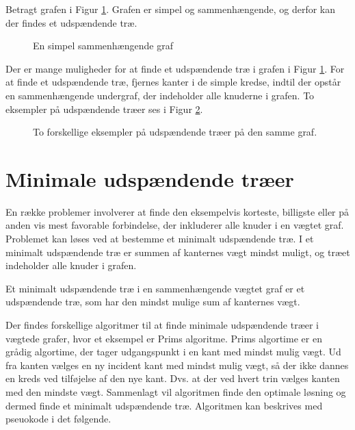 \begin{exmp}
Betragt grafen i Figur \ref{eksempel_udspaendende}. Grafen er simpel og sammenhængende, og derfor kan der findes et udspændende træ. 
\end{exmp}

\begin{figure}[h]
\centering

\caption{En simpel sammenhængende graf} 
\label{eksempel_udspaendende}
\end{figure}

Der er mange muligheder for at finde et udspændende træ i grafen i Figur \ref{eksempel_udspaendende}. For at finde et udspændende træ, fjernes kanter i de simple kredse, indtil der opstår en sammenhængende undergraf, der indeholder alle knuderne i grafen. To eksempler på udspændende træer ses i Figur \ref{eksempel_udspaendende1}.

\begin{figure}[!htb]
	\centering
	\begin{minipage}[c]{0.45\linewidth}
		\centering
		
	\end{minipage}
	\begin{minipage}[c]{.45\linewidth}
		\centering
		
	\end{minipage}
	\caption{To forskellige eksempler på udspændende træer på den samme graf.} \label{eksempel_udspaendende1}
\end{figure}

\section{Minimale udspændende træer}

En række problemer involverer at finde den eksempelvis korteste, billigste eller på anden vis mest favorable forbindelse, der inkluderer alle knuder i en vægtet graf. Problemet kan løses ved at bestemme et minimalt udspændende træ. I et minimalt udspændende træ er summen af kanternes vægt mindst muligt, og træet indeholder alle knuder i grafen.

\begin{defn}
Et minimalt udspændende træ i en sammenhængende vægtet graf er et udspændende træ, som har den mindst mulige sum af kanternes vægt.
\end{defn}

Der findes forskellige algoritmer til at finde minimale udspændende træer i vægtede grafer, hvor et eksempel er Prims algoritme. 
Prims algortime er en grådig algortime, der tager udgangspunkt i en kant med mindst mulig vægt. 
Ud fra kanten vælges en ny incident kant med mindst mulig vægt, så der ikke dannes en kreds ved tilføjelse af den nye kant. 
Dvs. at der ved hvert trin vælges kanten med den mindste vægt. 
Sammenlagt vil algoritmen finde den optimale løsning og dermed finde et minimalt udspændende træ.
Algoritmen kan beskrives med pseuokode i det følgende.
 
